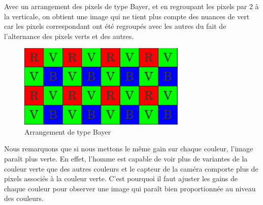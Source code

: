 Avec un arrangement des pixels de type Bayer, et en regroupant les pixels par 2 à la verticale, on obtient une image qui ne tient plus compte des nuances de vert car les pixels correspondant
ont été regroupés avec les autres du fait de l'alternance des pixels verts et des autres.

\begin{figure}[H]
      \center
      \includegraphics[width=8cm]{ressources/tp2/Bayer.png}
      \caption{Arrangement de type Bayer}
\end{figure}

Nous remarquons que si nous mettons le même gain sur chaque couleur, l'image paraît plus verte. En effet, l'homme est 
capable de voir plus de variantes de la couleur verte que des autres couleurs et le capteur de la caméra comporte plus 
de pixels associés à la couleur verte. C'est pourquoi il faut ajuster les gains
de chaque couleur pour observer une image qui paraît bien proportionnée au niveau des couleurs.\\



